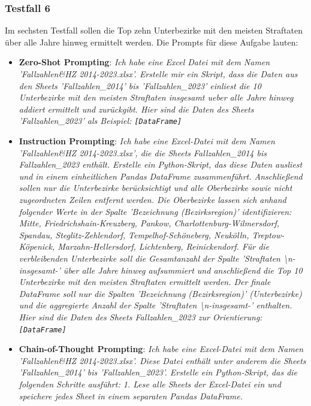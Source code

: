 \documentclass[11pt,a4paper]{article}
\begin{document}
\subsubsection{Testfall 6}
    Im sechsten Testfall sollen die Top zehn Unterbezirke mit den meisten Straftaten über alle Jahre hinweg ermittelt werden. Die Prompts für diese Aufgabe lauten:
    \begin{itemize}
        \item \textbf{Zero-Shot Prompting}: \emph{Ich habe eine Excel Datei mit dem Namen 'Fallzahlen\&HZ 2014-2023.xlsx'. Erstelle mir ein Skript, dass die Daten aus den Sheets 'Fallzahlen\_2014' bis 'Fallzahlen\_2023' einliest die 10 Unterbezirke mit den meisten Straftaten insgesamt ueber alle Jahre hinweg addiert ermittelt und zurückgibt.
        Hier sind die Daten des Sheets 'Fallzahlen\_2023' als Beispiel: \texttt{[DataFrame]}}
        \item \textbf{Instruction Prompting}: \emph{Ich habe eine Excel-Datei mit dem Namen 'Fallzahlen\&HZ 2014-2023.xlsx', die die Sheets Fallzahlen\_2014 bis Fallzahlen\_2023 enthält. Erstelle ein Python-Skript, das diese Daten ausliest und in einem einheitlichen Pandas DataFrame zusammenführt.
        Anschließend sollen nur die Unterbezirke berücksichtigt und alle Oberbezirke sowie nicht zugeordneten Zeilen entfernt werden. Die Oberbezirke lassen sich anhand folgender Werte in der Spalte 'Bezeichnung (Bezirksregion)' identifizieren: Mitte, Friedrichshain-Kreuzberg, Pankow, Charlottenburg-Wilmersdorf, Spandau, Steglitz-Zehlendorf, Tempelhof-Schöneberg, Neukölln, Treptow-Köpenick, Marzahn-Hellersdorf, Lichtenberg, Reinickendorf.
        Für die verbleibenden Unterbezirke soll die Gesamtanzahl der Spalte 'Straftaten \textbackslash n-insgesamt-' über alle Jahre hinweg aufsummiert und anschließend die Top 10 Unterbezirke mit den meisten Straftaten ermittelt werden. Der finale DataFrame soll nur die Spalten 'Bezeichnung (Bezirksregion)' (Unterbezirke) und die aggregierte Anzahl der Spalte 'Straftaten \textbackslash n-insgesamt-' enthalten.
        Hier sind die Daten des Sheets Fallzahlen\_2023 zur Orientierung: \texttt{[DataFrame]}}
        \item \textbf{Chain-of-Thought Prompting}: \emph{Ich habe eine Excel-Datei mit dem Namen 'Fallzahlen\&HZ 2014-2023.xlsx'. Diese Datei enthält unter anderem die Sheets 'Fallzahlen\_2014' bis 'Fallzahlen\_2023'. 
        Erstelle ein Python-Skript, das die folgenden Schritte ausführt:
        1. Lese alle Sheets der Excel-Datei ein und speichere jedes Sheet in einem separaten Pandas DataFrame.
}
\end{itemize}
\end{document}
